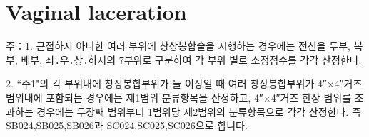 \section{Vaginal laceration}
{주：1. 근접하지 아니한 여러 부위에 창상봉합술을 시행하는 경우에는 전신을 두부, 복부, 배부, 좌․우․상․하지의 7부위로 구분하여 각 부위 별로 소정점수를 각각 산정한다.\par
2. “주1"의 각 부위내에 창상봉합부위가 둘 이상일 때 여러 창상봉합부위가 4″×4″거즈 범위내에 포함되는 경우에는 제1범위 분류항목을 산정하고, 4″×4″거즈 한장 범위를 초과하는 경우에는 두장째 범위부터 1범위당 제2범위의 분류항목으로 각각 산정한다. 즉 SB024,SB025,SB026과 SC024,SC025,SC026으로 합니다.}
